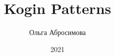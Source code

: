 \documentclass[a4paper ,12pt]{report}
\begin{document}
\title{Kogin Patterns}
\author{Ольга Абросимова}
\date{2021}
\maketitle

\begin{figure}[hbt!]
\centering
\end{figure}
\end{document}
